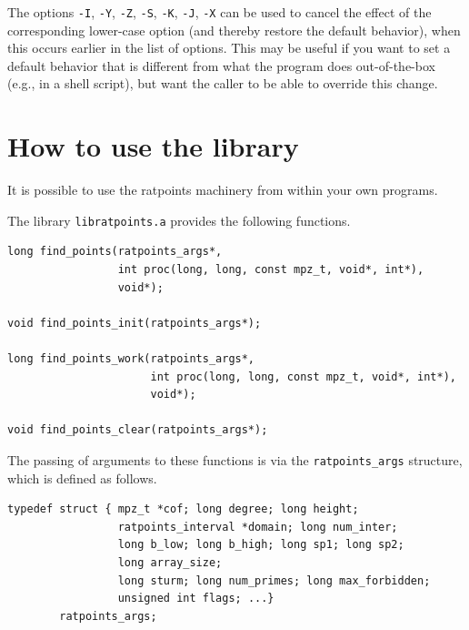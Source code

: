 \documentclass[12pt,a4paper,oneside]{amsart}
\begin{document}
The options \verb+-I+, \verb+-Y+, \verb+-Z+, \verb+-S+, \verb+-K+, \verb+-J+,
\verb+-X+ can be used to cancel the effect of the corresponding lower-case
option (and thereby restore the default behavior),
when this occurs earlier in the list of options. This may be useful if
you want to set a default behavior that is different from what the
program does out-of-the-box (e.g., in a shell script), but want the caller
to be able to override this change.


\section{How to use the library}\label{sec:library}

It is possible to use the ratpoints machinery from within your own programs.

The library \texttt{libratpoints.a} provides the following functions.

\begin{verbatim}
long find_points(ratpoints_args*,
                 int proc(long, long, const mpz_t, void*, int*),
                 void*);

void find_points_init(ratpoints_args*);

long find_points_work(ratpoints_args*,
                      int proc(long, long, const mpz_t, void*, int*),
                      void*);

void find_points_clear(ratpoints_args*);
\end{verbatim}

The passing of arguments to these functions is via the \texttt{ratpoints\_args}
structure, which is defined as follows.

\begin{verbatim}
typedef struct { mpz_t *cof; long degree; long height;
                 ratpoints_interval *domain; long num_inter;
                 long b_low; long b_high; long sp1; long sp2;
                 long array_size;
                 long sturm; long num_primes; long max_forbidden;
                 unsigned int flags; ...}
        ratpoints_args;
\end{verbatim}
\end{document}
